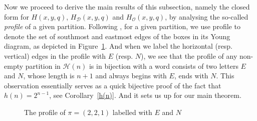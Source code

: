 \documentclass[12pt]{amsart}
\numberwithin{equation}{section}
\theoremstyle{plain}
\theoremstyle{definition}
\def\D{\mathcal{D}}
\def\O{\mathcal{O}}
\def\H{\mathcal{H}}
\begin{document}
Now we proceed to derive the main results of this subsection, namely the closed form for $H(x,y,q)$, $H_{\D}(x,y,q)$ and $H_{\O}(x,y,q)$, by analysing the so-called \emph{profile} of a given partition. Following \cite{KN}, for a given partition, we use profile to denote the set of southmost and eastmost edges of the boxes in its Young diagram, as depicted in Figure~\ref{profile}. And when we label the horizontal (resp. vertical) edges in the profile with $E$ (resp. $N$), we see that the profile of any non-empty partition in $\H(n)$ is in bijection with a word consists of two letters $E$ and $N$, whose length is $n+1$ and always begins with $E$, ends with $N$. This observation essentially serves as a quick bijective proof of the fact that $h(n)=2^{n-1}$, see Corollary~\ref{h(n)}. And it sets us up for our main theorem.


\begin{figure}
\caption{The profile of $\pi=(2,2,1)$ labelled with $E$ and $N$}
\label{profile}
\end{figure}
\end{document}
